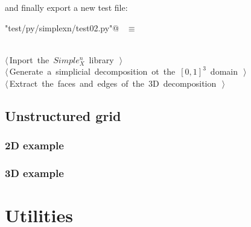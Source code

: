 \documentclass[11pt,oneside]{article}	%
\begin{document}
and finally export a new test file:

\begin{flushleft} \small \label{scrap16}
\verb@"test/py/simplexn/test02.py"@\nobreak\ {\footnotesize {} }$\equiv$
\vspace{-1ex}
\begin{list}{}{} \item
\mbox{}\verb@@\\
\mbox{}\verb@@\hbox{$\langle\,$Inport the $Simple_X^n$ library\nobreak\ {\footnotesize {}}$\,\rangle$}\verb@@\\
\mbox{}\verb@@\hbox{$\langle\,$Generate a simplicial decomposition ot the $[0,1]^3$ domain\nobreak\ {\footnotesize {}}$\,\rangle$}\verb@@\\
\mbox{}\verb@@\hbox{$\langle\,$Extract the faces and edges of the 3D decomposition\nobreak\ {\footnotesize {}}$\,\rangle$}\verb@@\\
\mbox{}\verb@@{\NWsep}
\end{list}
\vspace{-2ex}
\end{flushleft}


\subsection{Unstructured grid}


\subsubsection{2D example}


\subsubsection{3D example}


\appendix
\section{Utilities}
\end{document}
